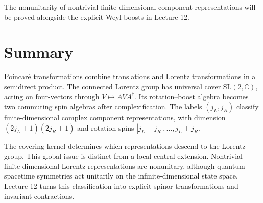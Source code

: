 \documentclass[11pt]{article}
\newcommand{\C}{\mathbb C}
\newcommand{\SL}{\mathrm{SL}}
\begin{document}
The nonunitarity of nontrivial finite-dimensional component representations
will be proved alongside the explicit Weyl boosts in Lecture 12.

\section*{Summary}
Poincar\'e transformations combine translations and Lorentz transformations
in a semidirect product. The connected Lorentz group has universal cover
\(\SL(2,\C)\), acting on four-vectors through \(V\mapsto AVA^\dagger\).
Its rotation--boost algebra becomes two commuting spin algebras after
complexification. The labels \((j_L,j_R)\) classify finite-dimensional
complex component representations, with dimension
\((2j_L+1)(2j_R+1)\) and rotation spins
\(|j_L-j_R|,\ldots,j_L+j_R\).

The covering kernel determines which representations descend to the
Lorentz group. This global issue is distinct from a local central
extension. Nontrivial finite-dimensional Lorentz representations are
nonunitary, although quantum spacetime symmetries act unitarily on the
infinite-dimensional state space. Lecture 12 turns this classification
into explicit spinor transformations and invariant contractions.

\newpage
\end{document}
